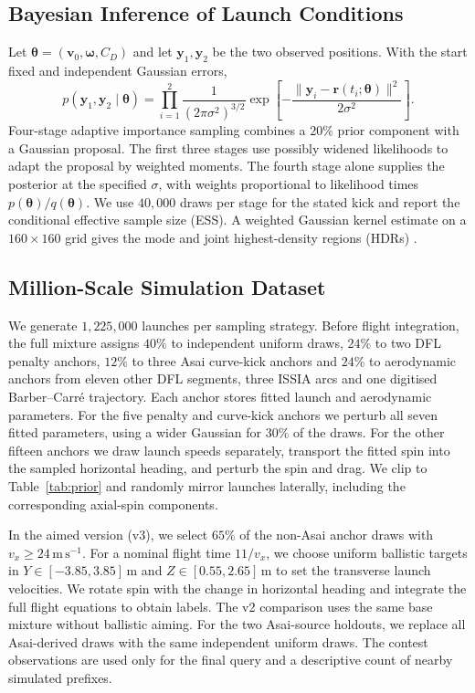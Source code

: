 \documentclass[11pt,a4paper]{article}
\begin{document}
\subsection{Bayesian Inference of Launch Conditions}

Let $\boldsymbol{\theta}=(\mathbf{v}_0,\boldsymbol{\omega},C_D)$ and let $\mathbf{y}_1,\mathbf{y}_2$ be the two observed positions. With the start fixed and independent Gaussian errors,
\begin{equation}
  p(\mathbf{y}_1,\mathbf{y}_2\mid\boldsymbol{\theta})
  =\prod_{i=1}^{2}\frac{1}{(2\pi\sigma^2)^{3/2}}
   \exp\!\left[-\frac{\|\mathbf{y}_i-\mathbf{r}(t_i;\boldsymbol{\theta})\|^2}{2\sigma^2}\right].
  \label{eq:lik}
\end{equation}
Four-stage adaptive importance sampling combines a $20\%$ prior component with a Gaussian proposal. The first three stages use possibly widened likelihoods to adapt the proposal by weighted moments. The fourth stage alone supplies the posterior at the specified $\sigma$, with weights proportional to likelihood times $p(\boldsymbol\theta)/q(\boldsymbol\theta)$. We use $40{,}000$ draws per stage for the stated kick and report the conditional effective sample size (ESS). A weighted Gaussian kernel estimate on a $160\times160$ grid gives the mode and joint highest-density regions (HDRs) \cite{hyndman1996}.


\subsection{Million-Scale Simulation Dataset}
\label{sec:splits}

We generate $1{,}225{,}000$ launches per sampling strategy. Before flight integration, the full mixture assigns $40\%$ to independent uniform draws, $24\%$ to two DFL penalty anchors, $12\%$ to three Asai curve-kick anchors and $24\%$ to aerodynamic anchors from eleven other DFL segments, three ISSIA arcs and one digitised Barber--Carr\'e trajectory. Each anchor stores fitted launch and aerodynamic parameters. For the five penalty and curve-kick anchors we perturb all seven fitted parameters, using a wider Gaussian for $30\%$ of the draws. For the other fifteen anchors we draw launch speeds separately, transport the fitted spin into the sampled horizontal heading, and perturb the spin and drag. We clip to Table~\ref{tab:prior} and randomly mirror launches laterally, including the corresponding axial-spin components.

In the aimed version (v3), we select $65\%$ of the non-Asai anchor draws with $v_x\ge24\,\mathrm{m\,s^{-1}}$. For a nominal flight time $11/v_x$, we choose uniform ballistic targets in $Y\in[-3.85,3.85]\,\mathrm{m}$ and $Z\in[0.55,2.65]\,\mathrm{m}$ to set the transverse launch velocities. We rotate spin with the change in horizontal heading and integrate the full flight equations to obtain labels. The v2 comparison uses the same base mixture without ballistic aiming. For the two Asai-source holdouts, we replace all Asai-derived draws with the same independent uniform draws. The contest observations are used only for the final query and a descriptive count of nearby simulated prefixes.
\end{document}

